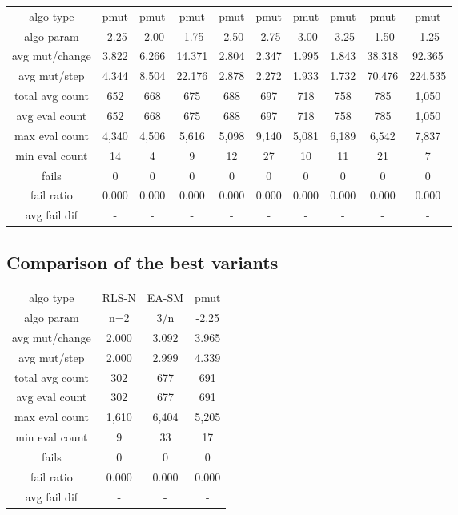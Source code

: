 \begin{tabular}[h]{cccccccccc}
algo type&           pmut&    pmut&    pmut&    pmut&    pmut&    pmut&    pmut&    pmut&    pmut\\
algo param&         -2.25&   -2.00&   -1.75&   -2.50&   -2.75&   -3.00&   -3.25&   -1.50&   -1.25\\
avg mut/change&     3.822&   6.266&  14.371&   2.804&   2.347&   1.995&   1.843&  38.318&  92.365\\
avg mut/step&       4.344&   8.504&  22.176&   2.878&   2.272&   1.933&   1.732&  70.476& 224.535\\
\hline
total avg count&      652&     668&     675&     688&     697&     718&     758&     785&   1,050\\
avg eval count&       652&     668&     675&     688&     697&     718&     758&     785&   1,050\\
max eval count&     4,340&   4,506&   5,616&   5,098&   9,140&   5,081&   6,189&   6,542&   7,837\\
min eval count&        14&       4&       9&      12&      27&      10&      11&      21&       7\\
\hline
fails&                  0&       0&       0&       0&       0&       0&       0&       0&       0\\
fail ratio&         0.000&   0.000&   0.000&   0.000&   0.000&   0.000&   0.000&   0.000&   0.000\\
avg fail dif&           -&       -&       -&       -&       -&       -&       -&       -&       -\\
\end{tabular}


\subsection{Comparison of the best variants}


\begin{tabular}[h]{cccc}
algo type&        RLS-N& EA-SM&  pmut\\
algo param&         n=2&   3/n& -2.25\\
avg mut/change&   2.000& 3.092& 3.965\\
avg mut/step&     2.000& 2.999& 4.339\\
\hline
total avg count&    302&   677&   691\\
avg eval count&     302&   677&   691\\
max eval count&   1,610& 6,404& 5,205\\
min eval count&       9&    33&    17\\
\hline
fails&                0&     0&     0\\
fail ratio&       0.000& 0.000& 0.000\\
avg fail dif&         -&     -&     -\\
\end{tabular}

